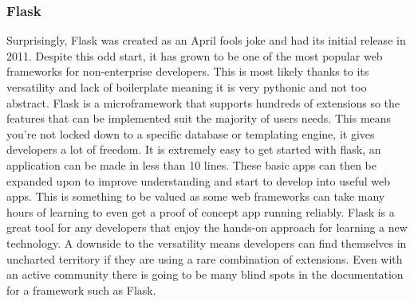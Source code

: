 \documentclass[12pt]{article}
\begin{document}
        \subsubsection{Flask}
Surprisingly, Flask was created as an April fools joke\cite{technologyOpeningTheFlask} and had its initial release in 2011. Despite this odd start, it has grown to be one of the most popular web frameworks for non-enterprise developers. This is most likely thanks to its versatility and lack of boilerplate meaning it is very pythonic and not too abstract.\bigbreak 
\noindent
Flask is a microframework that supports hundreds of extensions so the features that can be implemented suit the majority of users needs. This means you’re not locked down to a specific database or templating engine, it gives developers a lot of freedom.\bigbreak 
\noindent
It is extremely easy to get started with flask, an application can be made in less than 10 lines. These basic apps can then be expanded upon to improve understanding and start to develop into useful web apps. This is something to be valued as some web frameworks can take many hours of learning to even get a proof of concept app running reliably. Flask is a great tool for any developers that enjoy the hands-on approach for learning a new technology.\bigbreak 
\noindent
A downside to the versatility means developers can find themselves in uncharted territory if they are using a rare combination of extensions. Even with an active community there is going to be many blind spots in the documentation for a framework such as Flask.
\end{document}
